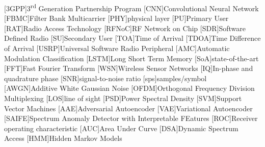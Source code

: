 \begin{acronym}[HBCI]
%
%
%
%
%

[3GPP]{3\textsuperscript{rd} Generation Partnership Program}
[CNN]{Convolutional Neural Network}
[FBMC]{Filter Bank Multicarrier}
[PHY]{physical layer}
[PU]{Primary User}
[RAT]{Radio Access Technology}
[RFNoC]{RF Network on Chip}
[SDR]{Software Defined Radio}
[SU]{Secondary User}
[TOA]{Time of Arrival}
[TDOA]{Time Difference of Arrival}
[USRP]{Universal Software Radio Peripheral}
[AMC]{Automatic Modulation Classification}
[LSTM]{Long Short Term Memory}
[SoA]{state-of-the-art}
[FFT]{Fast Fourier Transform}
[WSN]{Wireless Sensor Networks}
[IQ]{In-phase and quadrature phase}
[SNR]{signal-to-noise ratio}
[sps]{samples/symbol}
[AWGN]{Additive White Gaussian Noise}
[OFDM]{Orthogonal Frequency Division Multiplexing}
[LOS]{line of sight}
[PSD]{Power Spectral Density}
[SVM]{Support Vector Machines}
[AAE]{Adversarial Autoencoder}
[VAE]{Variational Autoencoder}
[SAIFE]{Spectrum Anomaly Detector with Interpretable FEatures}
[ROC]{Receiver operating characteristic}
[AUC]{Area Under Curve}
[DSA]{Dynamic Spectrum Access}
[HMM]{Hidden Markov Models}
\end{acronym}